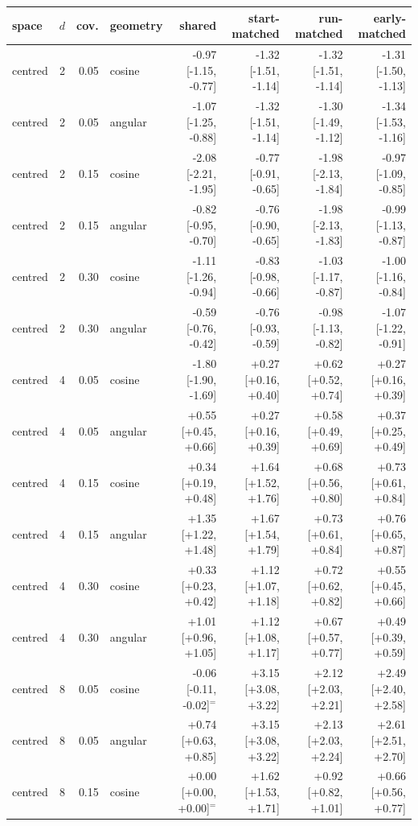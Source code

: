 \begin{tabular}{lrrlrrrr}
\toprule
space & $d$ & cov. & geometry & shared & start-matched & run-matched & early-matched \\
\midrule
centred & 2 & 0.05 & cosine & -0.97 [-1.15, -0.77] & -1.32 [-1.51, -1.14] & -1.32 [-1.51, -1.14] & -1.31 [-1.50, -1.13] \\
centred & 2 & 0.05 & angular & -1.07 [-1.25, -0.88] & -1.32 [-1.51, -1.14] & -1.30 [-1.49, -1.12] & -1.34 [-1.53, -1.16] \\
centred & 2 & 0.15 & cosine & -2.08 [-2.21, -1.95] & -0.77 [-0.91, -0.65] & -1.98 [-2.13, -1.84] & -0.97 [-1.09, -0.85] \\
centred & 2 & 0.15 & angular & -0.82 [-0.95, -0.70] & -0.76 [-0.90, -0.65] & -1.98 [-2.13, -1.83] & -0.99 [-1.13, -0.87] \\
centred & 2 & 0.30 & cosine & -1.11 [-1.26, -0.94] & -0.83 [-0.98, -0.66] & -1.03 [-1.17, -0.87] & -1.00 [-1.16, -0.84] \\
centred & 2 & 0.30 & angular & -0.59 [-0.76, -0.42] & -0.76 [-0.93, -0.59] & -0.98 [-1.13, -0.82] & -1.07 [-1.22, -0.91] \\
centred & 4 & 0.05 & cosine & -1.80 [-1.90, -1.69] & +0.27 [+0.16, +0.40] & +0.62 [+0.52, +0.74] & +0.27 [+0.16, +0.39] \\
centred & 4 & 0.05 & angular & +0.55 [+0.45, +0.66] & +0.27 [+0.16, +0.39] & +0.58 [+0.49, +0.69] & +0.37 [+0.25, +0.49] \\
centred & 4 & 0.15 & cosine & +0.34 [+0.19, +0.48] & +1.64 [+1.52, +1.76] & +0.68 [+0.56, +0.80] & +0.73 [+0.61, +0.84] \\
centred & 4 & 0.15 & angular & +1.35 [+1.22, +1.48] & +1.67 [+1.54, +1.79] & +0.73 [+0.61, +0.84] & +0.76 [+0.65, +0.87] \\
centred & 4 & 0.30 & cosine & +0.33 [+0.23, +0.42] & +1.12 [+1.07, +1.18] & +0.72 [+0.62, +0.82] & +0.55 [+0.45, +0.66] \\
centred & 4 & 0.30 & angular & +1.01 [+0.96, +1.05] & +1.12 [+1.08, +1.17] & +0.67 [+0.57, +0.77] & +0.49 [+0.39, +0.59] \\
centred & 8 & 0.05 & cosine & -0.06 [-0.11, -0.02]$^{=}$ & +3.15 [+3.08, +3.22] & +2.12 [+2.03, +2.21] & +2.49 [+2.40, +2.58] \\
centred & 8 & 0.05 & angular & +0.74 [+0.63, +0.85] & +3.15 [+3.08, +3.22] & +2.13 [+2.03, +2.24] & +2.61 [+2.51, +2.70] \\
centred & 8 & 0.15 & cosine & +0.00 [+0.00, +0.00]$^{=}$ & +1.62 [+1.53, +1.71] & +0.92 [+0.82, +1.01] & +0.66 [+0.56, +0.77] \\

\end{tabular}
